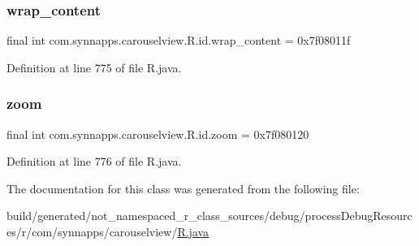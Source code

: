 \subsubsection{\texorpdfstring{wrap\_content}{wrap\_content}}
{\footnotesize\ttfamily final int com.\+synnapps.\+carouselview.\+R.\+id.\+wrap\+\_\+content = 0x7f08011f\hspace{0.3cm}{\ttfamily [static]}}



Definition at line 775 of file R.\+java.

\mbox{\label{classcom_1_1synnapps_1_1carouselview_1_1_r_1_1id_af872f48dda88ab7bc9941b95fce004ae}} 
\subsubsection{\texorpdfstring{zoom}{zoom}}
{\footnotesize\ttfamily final int com.\+synnapps.\+carouselview.\+R.\+id.\+zoom = 0x7f080120\hspace{0.3cm}{\ttfamily [static]}}



Definition at line 776 of file R.\+java.



The documentation for this class was generated from the following file\+:\begin{DoxyCompactItemize}
\item 
build/generated/not\+\_\+namespaced\+\_\+r\+\_\+class\+\_\+sources/debug/process\+Debug\+Resources/r/com/synnapps/carouselview/\mbox{\hyperlink{com_2synnapps_2carouselview_2_r_8java}{R.\+java}}\end{DoxyCompactItemize}

